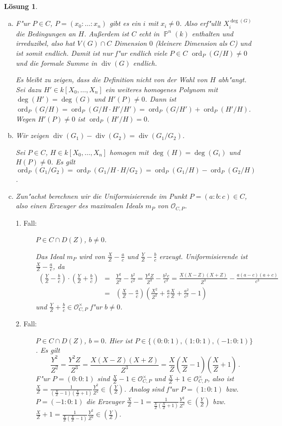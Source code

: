 \documentclass[a4paper, 12pt, numbers=noendperiod, chapterprefix=true]{scrbook}
\theoremstyle{break}
\newtheorem{Loes}{L\"osung}
\theoremstyle{nonumberbreak}
\theoremstyle{nonumberplain}
\DeclareMathOperator{\Divisor}{div}
\DeclareMathOperator{\ord}{ord}
\newcommand{\A}{\mathbb{A}}
\DeclareMathOperator{\Projective}{\mathbb{P}} %
\newcommand{\calO}{\mathcal{O}}
\begin{document}
\begin{Loes}\begin{enumerate}[a)]
\item
	F"ur $P \in C$, $P = (x_0 \colon \dots \colon x_n)$ gibt es ein $i$ mit $x_i \neq 0$. Also erf"ullt $X_i^{\deg(G)}$ die Bedingungen an $H$. Au\ss erdem ist $C$ echt in $\Projective^n(k)$ enthalten und irreduzibel, also hat $V(G) \cap C$ Dimension $0$ (kleinere Dimension als $C$) und ist somit endlich. Damit ist nur f"ur endlich viele $P \in C$ $\ord_P(G/H) \neq 0$ und die formale Summe in $\Divisor(G)$ endlich.
 
	Es bleibt zu zeigen, dass die Definition nicht von der Wahl von $H$ abh"angt. Sei dazu $H' \in k[X_0, \dots, X_n]$ ein weiteres homogenes Polynom mit $\deg(H') = \deg (G)$ und $H'(P) \neq 0$. Dann ist $\ord_P(G/H) = \ord_P(G/H \cdot H'/H') = \ord_P(G/H') + \ord_P(H'/H)$. Wegen $H'(P) \neq 0$ ist $\ord_P(H'/H) = 0$.
\item
	Wir zeigen $\Divisor(G_1) - \Divisor(G_2) = \Divisor(G_1/G_2)$.

	Sei $P \in C$, $H \in k[X_0, \dots, X_n]$ homogen mit $\deg(H) = \deg(G_i)$ und $H(P) \neq 0$. Es gilt $\ord_P(G_1/G_2) = \ord_P(G_1/H \cdot H /G_2) = \ord_P(G_1/H) - \ord_P(G_2/H)$.
\item
	 Zun"achst berechnen wir die Uniformisierende im Punkt $P = (a : b : c) \in C$, also einen Erzeuger des maximalen Ideals $m_P$ von $\calO_{C,P}$. 
	\begin{description}
	\item[1. Fall:]
		$P \in C \cap D(Z)$, $b \neq 0$.

		Das Ideal $m_P$ wird von $\frac{X}{Z} - \frac{a}{c}$ und $\frac{Y}{Z} - \frac{b}{c}$ erzeugt. Uniformisierende ist $\frac{X}{Z} - \frac{a}{c}$, da 
		\begin{eqnarray*}
			(\frac{Y}{Z} - \frac{b}{c}) \cdot (\frac{Y}{Z} + \frac{b}{c}) 
			&=& \frac{Y^2}{Z^2} - \frac{b^2}{c^2} 
			= \frac{Y^2Z}{Z^3} - \frac{b^2c}{c^3} 
			= \frac{X(X-Z)(X+Z)}{Z^3} - \frac{a(a-c)(a+c)}{c^3}\\
			&=& (\frac{X}{Z} - \frac{a}{c}) (\frac{X^2}{Z^2} + \frac{a}{c} \frac{X}{Z} + \frac{a^2}{c^2} - 1)
		\end{eqnarray*}
		und $\frac{Y}{Z} + \frac{b}{c} \in \calO_{C,P}^\times$ f"ur $b \neq 0$.
	\item[2. Fall:]
		$P \in C \cap D(Z)$, $b = 0$. Hier ist $P \in \{(0:0:1), (1:0:1), (-1:0:1)\}$. Es gilt
			\[\frac{Y^2}{Z^2} = \frac{Y^2Z}{Z^3} = \frac{X(X-Z)(X+Z)}{Z^3} = \frac{X}{Z} (\frac{X}{Z} -1)(\frac{X}{Z} +1)\,.\]
		F"ur $P = (0:0:1)$ sind $\frac{X}{Z} -1 \in \calO_{C,P}^\times$ und $\frac{X}{Z} +1 \in \calO_{C,P}^\times$, also ist $\frac{X}{Z} = \frac{1}{(\frac{X}{Z} -1)(\frac{X}{Z} +1)} \frac{Y^2}{Z^2} \in (\frac{Y}{Z})$. Analog sind f"ur $P = (1:0:1)$ bzw. $P = (-1:0:1)$ die Erzeuger $\frac{X}{Z} - 1 = \frac{1}{\frac{X}{Z}(\frac{X}{Z} +1)} \frac{Y^2}{Z^2} \in \left(\frac{Y}{Z}\right)$ bzw. $\frac{X}{Z} + 1 = \frac{1}{\frac{X}{Z}(\frac{X}{Z} - 1)} \frac{Y^2}{Z^2} \in \left(\frac{Y}{Z}\right)$.


\end{description}
\end{enumerate}
\end{Loes}
\end{document}
